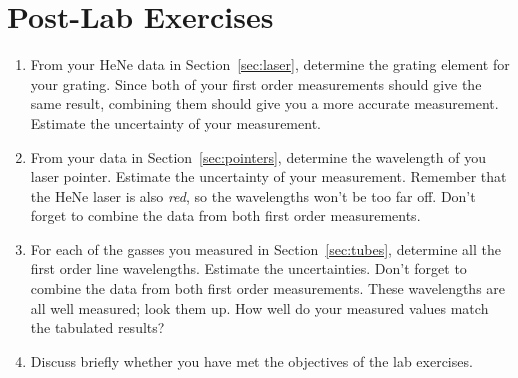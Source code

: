 \documentclass[12pt]{article}
\begin{document}
\newpage

\section*{Post-Lab Exercises}

\begin{enumerate}
\item From your HeNe data in Section~\ref{sec:laser}, determine the
  grating element for your grating.  Since both of your first order
  measurements should give the same result, combining them should give
  you a more accurate measurement.  Estimate the uncertainty of your
  measurement.
\item From your data in Section~\ref{sec:pointers}, determine the
  wavelength of you laser pointer.  Estimate the uncertainty of your
  measurement.  Remember that the HeNe laser is also \textit{red}, so
  the wavelengths won't be too far off.  Don't forget to combine the
  data from both first order measurements.
\item For each of the gasses you measured in Section~\ref{sec:tubes},
  determine all the first order line wavelengths.  Estimate the
  uncertainties.  Don't forget to combine the data from both first
  order measurements.  These wavelengths are all well measured; look
  them up.  How well do your measured values match the tabulated
  results? 
\item Discuss briefly whether you have met the objectives of the lab
  exercises.
\end{enumerate}
\end{document}
